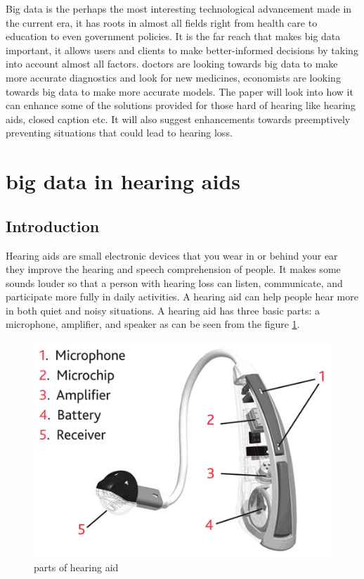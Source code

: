 \documentclass[sigconf]{acmart}
\begin{document}
Big data is the perhaps the most interesting technological advancement made in the current era, it has roots in almost all fields right from health care to education to even government policies. It is the far reach that makes big data important, it allows users and clients to make better-informed decisions by taking into account almost all factors. doctors are looking towards big data to make more accurate diagnostics and look for new medicines, economists are looking towards big data to make more accurate models. The paper will look into how it can enhance some of the solutions provided for those hard of hearing like hearing aids, closed caption etc. It will also suggest enhancements towards preemptively preventing situations that could lead to hearing loss\cite{Wikipedia2017}.

\section{big data in hearing aids}

\subsection{Introduction}


Hearing aids are small electronic devices that you wear in or behind your ear they improve the hearing and speech comprehension of people. It makes some sounds louder so that a person with hearing loss can listen, communicate, and participate more fully in daily activities. A hearing aid can help people hear more in both quiet and noisy situations. A hearing aid has three basic parts: a microphone, amplifier, and speaker as can be seen from the figure \ref{f:hearingaidparts}.

\begin{figure}[!ht]
  \centering\includegraphics[width=\columnwidth]{images/hearingaidbreakdown.jpg}
  \caption{parts of hearing aid}\label{f:hearingaidparts}
\end{figure}  
\end{document}
